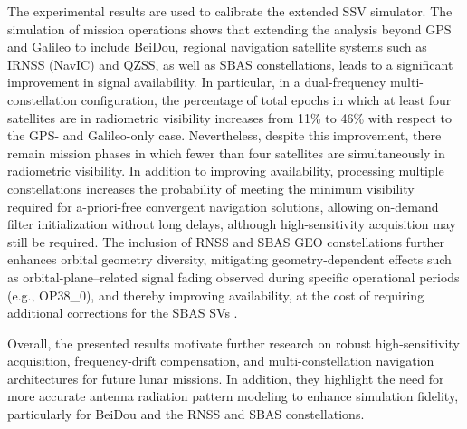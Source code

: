 \documentclass{IEEEtaes}
\begin{document}
The experimental results are used to calibrate the extended \gls{SSV} simulator. The simulation of mission operations shows that extending the analysis beyond \gls{GPS} and Galileo to include BeiDou, regional navigation satellite systems such as \gls{IRNSS} (NavIC) and \gls{QZSS}, as well as \gls{SBAS} constellations, leads to a significant improvement in signal availability. In particular, in a dual-frequency multi-constellation configuration, the percentage of total epochs in which at least four satellites are in radiometric visibility increases from 11\% to 46\% with respect to the GPS- and Galileo-only case. Nevertheless, despite this improvement, there remain mission phases in which fewer than four satellites are simultaneously in radiometric visibility. 
In addition to improving availability, processing multiple constellations increases the probability of meeting the minimum visibility required for a-priori-free convergent navigation solutions, allowing on-demand filter initialization without long delays, although high-sensitivity acquisition may still be required. The inclusion of \gls{RNSS} and \gls{SBAS} \gls{GEO} constellations further enhances orbital geometry diversity, mitigating geometry-dependent effects such as orbital-plane–related signal fading observed during specific operational periods (e.g., OP38\_0), and thereby improving availability, at the cost of requiring additional corrections for the \gls{SBAS} \glspl{SV} \cite{kahr2016analysis}.

Overall, the presented results motivate further research on robust high-sensitivity acquisition, frequency-drift compensation, and multi-constellation navigation architectures for future lunar missions. In addition, they highlight the need for more accurate antenna radiation pattern modeling to enhance simulation fidelity, particularly for BeiDou and the \gls{RNSS} and \gls{SBAS} constellations.
\end{document}
